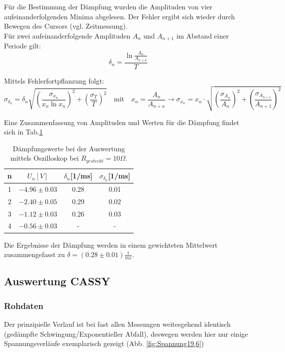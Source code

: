 \documentclass[12pt,a4paper]{article}
\begin{document}
Für die Bestimmung der Dämpfung wurden die Amplituden von vier aufeinanderfolgenden Minima abgelesen. Der Fehler ergibt sich wieder durch Bewegen des Cursors (vgl. Zeitmessung).\\
Für zwei aufeinanderfolgende Amplituden $A_n$ und $A_{n+1}$ im Abstand einer Periode gilt:
\begin{equation}
\delta_n=\frac{\ln{\frac{A_n}{A_{n+a}}}}{T}
\end{equation}

Mittels Fehlerfortpflanzung folgt:
\begin{equation}
\sigma_{\delta_n}=\delta_n \sqrt{(\frac{\sigma_{x_n}}{x_n \ln{x_n}})^2+(\frac{\sigma_T}{T})^2} \quad \text{mit} \quad x_n=\frac{A_n}{A_{n+a}} \rightarrow \sigma_{x_n}=x_n\cdot \sqrt{(\frac{\sigma_{A_n}}{A_n})^2+(\frac{\sigma_{A_{n+1}}}{A_{n+1}})^2}
\end{equation}

Eine Zusammenfassung von Amplituden und Werten für die Dämpfung findet sich in Tab.\ref{tab:DämpfungOszi}
\begin{table}
\begin{center}
\begin{tabular}{|c|c|c|c|}
\hline
n & $U_n[V]$ & $\delta_n$[1/ms] & $\sigma_{\delta_n}$[1/ms]\\
\hline
1 & $-4.96 \pm 0.03$ & 0.28 & 0.01\\
\hline
2 & $-2.40 \pm 0.05$ & 0.29 & 0.02\\
\hline
3 & $-1.12 \pm 0.03$ & 0.26 & 0.03\\
\hline
4 & $-0.56 \pm 0.03$ & - & -\\
\hline
\end{tabular}
\end{center}
\caption{Dämpfungswerte bei der Auswertung mittels Oszilloskop bei $R_{gesteckt}=10 \Omega$.}
\label{tab:DämpfungOszi}
\end{table}

Die Ergebnisse der Dämpfung werden in einem gewichteten Mittelwert zusammengefasst zu $\delta=(0.28 \pm 0.01)\frac{1}{ms}$.



\subsection{Auswertung CASSY}
\subsubsection{Rohdaten}
Der prinzipielle Verlauf ist bei fast allen Messungen weitesgehend identisch (gedämpfte Schwingung/Exponentieller Abfall), deswegen werden hier nur einige Spannungsverläufe exemplarisch gezeigt (Abb. \ref{fig:Spannung19,6})
\end{document}
